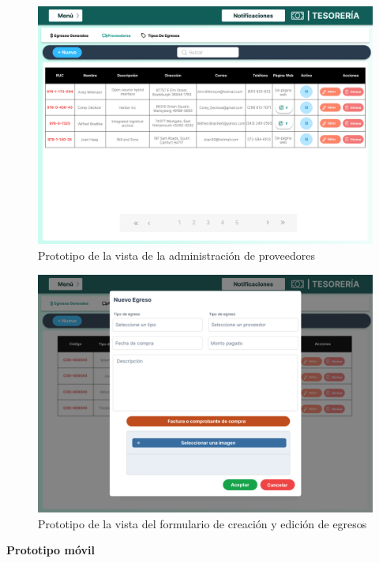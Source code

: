 \begin{figure}[H]
    \centering
    \includegraphics[width=1\textwidth]{resources/images/tesoreia - egresos - proveedores}
    \caption{Prototipo de la vista de la administración de proveedores}
    \label{fig:tesoreria-egresos-proveedores}
\end{figure}

\begin{figure}[H]
    \centering
    \includegraphics[width=1\textwidth]{resources/images/tesoreia - egresos - generales-edit}
    \caption{Prototipo de la vista del formulario de creación y edición de egresos}
    \label{fig:tesoreria-egresos-formulario}
\end{figure}

\textbf{Prototipo móvil}
\bigbreak

